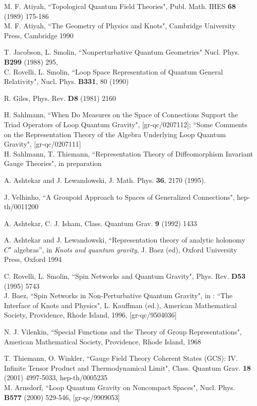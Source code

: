 \documentclass[12pt]{report}
\begin{document}
\begin{thebibliography}{99}
 M. F. Atiyah, ``Topological Quantum Field Theories", Publ. Math.
IHES {\bf 68} (1989) 175-186\\
M. F. Atiyah, ``The Geometry of Physics and Knots", Cambridge University
Press, Cambridge 1990

 T. Jacobson, L. Smolin,
``Nonperturbative Quantum Geometries"
Nucl. Phys. {\bf B299} (1988) 295,\\
C. Rovelli, L. Smolin, ``Loop Space Representation of Quantum General
Relativity", Nucl. Phys. {\bf B331}, 80 (1990)

 R. Giles, Phys. Rev. {\bf D8} (1981) 2160

H. Sahlmann, ``When Do Measures on the Space of Connections Support the Triad
Operators of Loop Quantum Gravity", [gr-qc/0207112];
``Some Comments on the Representation Theory of the Algebra 
Underlying Loop Quantum Gravity", [gr-qc/0207111]\\
H. Sahlmann, T. Thiemann, ``Representation Theory of Diffeomorphism 
Invariant Gauge Theories", in preparation

 A. Ashtekar and J. Lewandowski, J. Math. Phys. {\bf 36}, 2170
(1995). 

 J. Velhinho,
``A Groupoid Approach to Spaces of Generalized Connections",
hep-th/0011200

 A. Ashtekar, C. J. Isham,
Class. Quantum Grav. {\bf 9} (1992) 1433 

 A. Ashtekar and J. Lewandowski, ``Representation
theory of analytic holonomy $C^\star$ algebras'', in {\it Knots and
quantum gravity}, J. Baez (ed), Oxford University Press, Oxford 1994

 C. Rovelli, L. Smolin, ``Spin Networks and Quantum Gravity",
Phys. Rev. {\bf D53} (1995) 5743\\
J. Baez, ``Spin Networks in Non-Perturbative Quantum Gravity",
in : ``The Interface of Knots and Physics", L. Kauffman (ed.), American
Mathematical Society, Providence, Rhode Island, 1996, [gr-qc/9504036]

 N. J. Vilenkin, ``Special Functions and the Theory of Group 
Representations", American Mathematical Society, Providence, Rhode
Island, 1968

T. Thiemann, O. Winkler, ``Gauge Field Theory Coherent States
(GCS): IV. Infinite Tensor Product and Thermodynamical Limit",
Class. Quantum Grav. {\bf 18} (2001) 4997-5033, hep-th/0005235\\
M. Arnsdorf, ``Loop Quantum Gravity on Noncompact Spaces",
Nucl. Phys. {\bf B577} (2000) 529-546, [gr-qc/9909053]


\end{thebibliography}
\end{document}
